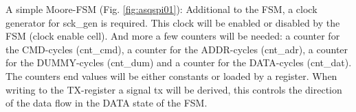 A simple Moore-FSM (Fig. \ref{fig:asqspi01}): Additional to the FSM, a clock generator for sck\_gen is required. This clock will be enabled or disabled by the FSM (clock enable cell). And more a few counters will be needed: a counter for the CMD-cycles (cnt\_cmd), a counter for the ADDR-cycles (cnt\_adr), a counter for the DUMMY-cycles (cnt\_dum) and a counter for the DATA-cycles (cnt\_dat). The counters end values will be either constants or loaded by a register. When writing to the TX-register a signal tx will be derived, this controls the direction of the data flow in the DATA state of the FSM. 
\begin{figure}[H]
\centering
{}
\end{figure}
